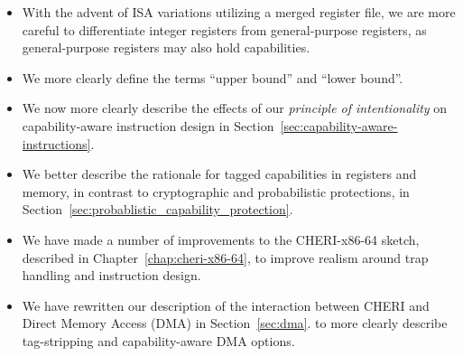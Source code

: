 \begin{itemize}
\item With the advent of ISA variations utilizing a merged register file, we
  are more careful to differentiate integer registers from general-purpose
  registers, as general-purpose registers may also hold capabilities.

\item We more clearly define the terms ``upper bound'' and ``lower bound''.

\item We now more clearly describe the effects of our \textit{principle of
  intentionality} on capa\-bility-aware instruction design in
  Section~\ref{sec:capability-aware-instructions}.

\item We better describe the rationale for tagged capabilities in registers
  and memory, in contrast to cryptographic and probabilistic protections, in
  Section~\ref{sec:probablistic_capability_protection}.

\item We have made a number of improvements to the CHERI-x86-64 sketch,
  described in Chapter~\ref{chap:cheri-x86-64}, to improve realism around trap
  handling and instruction design.

\item We have rewritten our description of the interaction between CHERI and
  Direct Memory Access (DMA) in Section~\ref{sec:dma}. to more clearly
  describe tag-stripping and capability-aware DMA options.

\end{itemize}
